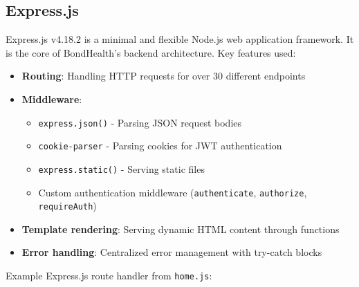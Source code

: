 \subsection{Express.js}
Express.js v4.18.2 is a minimal and flexible Node.js web application framework. It is the core of BondHealth's backend architecture. Key features used:

\begin{itemize}
    \item \textbf{Routing}: Handling HTTP requests for over 30 different endpoints
    \item \textbf{Middleware}: 
        \begin{itemize}
            \item \texttt{express.json()} - Parsing JSON request bodies
            \item \texttt{cookie-parser} - Parsing cookies for JWT authentication
            \item \texttt{express.static()} - Serving static files
            \item Custom authentication middleware (\texttt{authenticate}, \texttt{authorize}, \texttt{requireAuth})
        \end{itemize}
    \item \textbf{Template rendering}: Serving dynamic HTML content through functions
    \item \textbf{Error handling}: Centralized error management with try-catch blocks
\end{itemize}

Example Express.js route handler from \texttt{home.js}:

